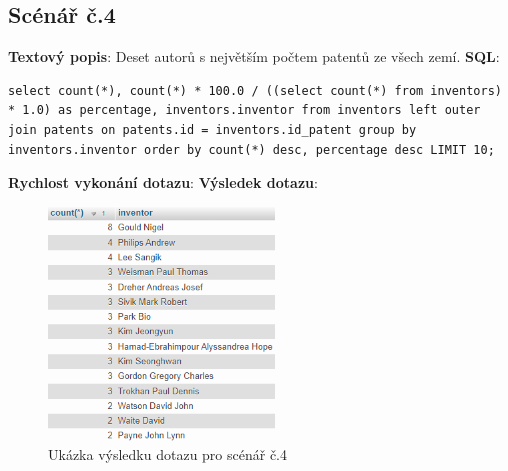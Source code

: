 \subsection{Scénář č.4} 
\textbf{Textový popis}: Deset autorů s největším počtem patentů ze všech zemí.
\newline
\textbf{SQL}: 
\begin{lstlisting}[label = {lst:elements_a}]
select count(*), count(*) * 100.0 / ((select count(*) from inventors) * 1.0) as percentage, inventors.inventor from inventors left outer join patents on patents.id = inventors.id_patent group by inventors.inventor order by count(*) desc, percentage desc LIMIT 10;
\end{lstlisting}
\textbf{Rychlost vykonání dotazu}: 
\newline
\textbf{Výsledek dotazu}:
\begin{figure}[H]
\centering
\includegraphics[width=6cm]{img/scenare/scenar_9}
\caption{Ukázka výsledku dotazu pro scénář č.4}
\label{fig:scenar4}
\end{figure}


